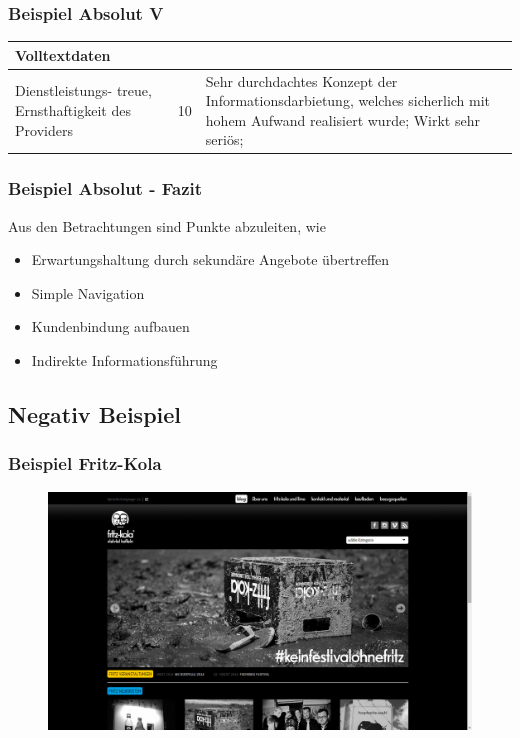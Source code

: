 \begin{frame}
	\frametitle{Beispiel Absolut V}
	\begin{tabular}{|p{}|l|p{6cm}|}
	\hline
	  Volltextdaten \\ \hline
	  Dienstleistungs- treue, Ernsthaftigkeit des Providers & 10 & Sehr durchdachtes Konzept der Informationsdarbietung, welches sicherlich mit hohem Aufwand realisiert wurde; Wirkt sehr seriös; \\ \hline
 	\end{tabular}
\end{frame}

\begin{frame}\frametitle{Beispiel Absolut - Fazit}
	Aus den Betrachtungen sind Punkte abzuleiten, wie 
	\begin{itemize}
		\item Erwartungshaltung durch sekundäre Angebote übertreffen
		\item Simple Navigation
		\item Kundenbindung aufbauen
		\item Indirekte Informationsführung
	\end{itemize}
\end{frame}

\subsection{Negativ Beispiel}
\begin{frame}
	\frametitle{Beispiel Fritz-Kola}
	\begin{figure}
	\includegraphics[scale=0.2]{bilder/fritz-kola.png}
	\end{figure}
\end{frame}

